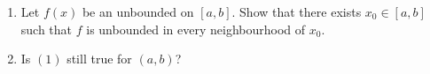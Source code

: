 \documentclass[11pt,a4paper]{article}
\begin{document}
\maketitle


\newpage
\tableofcontents
\newpage

\begin{exercise} \phantom{}
  \begin{enumerate}
    \item[(1)] Let $f(x)$ be an unbounded on $[a,b]$.
    Show that there exists $x_0 \in [a,b]$ such that $f$
    is unbounded in every neighbourhood of $x_0$.
    \item[(2)] Is $(1)$ still true for $(a,b)$?
  \end{enumerate}
\end{exercise}
\end{document}
